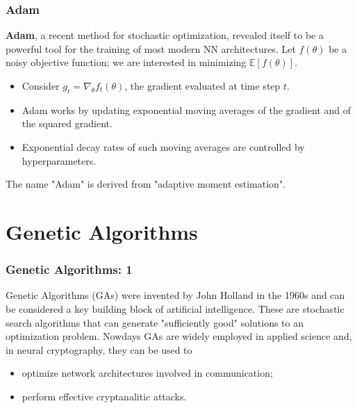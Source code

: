 \documentclass{beamer}
\begin{document}
\begin{frame}
\frametitle{Adam}
\textbf{Adam}, a recent method for stochastic optimization, revealed itself to be a powerful tool for the training of most modern NN architectures. Let $f(\theta)$ be a noisy objective function; we are interested in minimizing $\mathbb{E}\left[f(\theta)\right]$.
\begin{itemize}
\item Consider $g_t = \nabla_{\theta}f_t(\theta)$, the gradient evaluated at time step $t$.
\item Adam works by updating exponential moving averages of the gradient and of the squared gradient.
\item Exponential decay rates of such moving averages are controlled by hyperparameters.
\end{itemize}
The name "Adam" is derived from "adaptive moment estimation".
\end{frame}



\section{Genetic Algorithms}

\begin{frame}
\frametitle{Genetic Algorithms: 1}
Genetic Algorithms (GAs) were invented by John Holland in the 1960s and can
be considered a key building block of artificial intelligence. These are stochastic search algorithms that can generate  
"sufficiently good" solutions to an optimization problem. Nowdays GAs are widely employed
in applied science and, in neural cryptography, they can be used to
\begin{itemize}
\item optimize network architectures involved in communication;
\item perform effective cryptanalitic attacks.
\end{itemize}
\end{frame}
\end{document}
